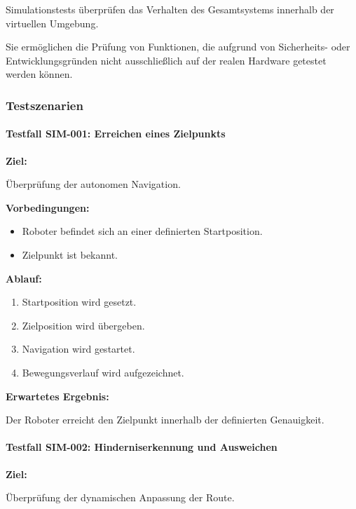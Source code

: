 \documentclass[
  a4paper,
  12pt,
  DIV=12,        %
  parskip=half,  %
  headings=small %
]{scrartcl}
\theoremstyle{definition}
\providecommand{\tightlist}{%
  \setlength{\itemsep}{0pt}\setlength{\parskip}{0pt}}
\theoremstyle{definition}
\begin{document}
Simulationstests überprüfen das Verhalten des Gesamtsystems innerhalb
der virtuellen Umgebung.

Sie ermöglichen die Prüfung von Funktionen, die aufgrund von
Sicherheits- oder Entwicklungsgründen nicht ausschließlich auf der
realen Hardware getestet werden können.

\subsubsection{Testszenarien}\label{testszenarien}

\paragraph{Testfall SIM-001: Erreichen eines
Zielpunkts}\label{testfall-sim-001-erreichen-eines-zielpunkts}

\textbf{Ziel:}

Überprüfung der autonomen Navigation.

\textbf{Vorbedingungen:}

\begin{itemize}
\tightlist
\item
  Roboter befindet sich an einer definierten Startposition.
\item
  Zielpunkt ist bekannt.
\end{itemize}

\textbf{Ablauf:}

\begin{enumerate}
\def\labelenumi{\arabic{enumi}.}
\tightlist
\item
  Startposition wird gesetzt.
\item
  Zielposition wird übergeben.
\item
  Navigation wird gestartet.
\item
  Bewegungsverlauf wird aufgezeichnet.
\end{enumerate}

\textbf{Erwartetes Ergebnis:}

Der Roboter erreicht den Zielpunkt innerhalb der definierten
Genauigkeit.

\paragraph{Testfall SIM-002: Hinderniserkennung und
Ausweichen}\label{testfall-sim-002-hinderniserkennung-und-ausweichen}

\textbf{Ziel:}

Überprüfung der dynamischen Anpassung der Route.
\end{document}

